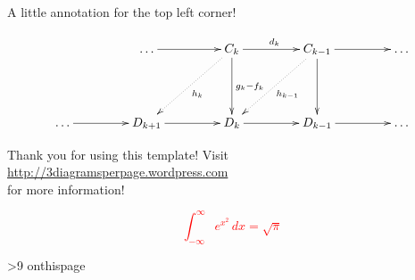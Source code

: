 \documentclass[a4paper]{article} %
\newcommand{\numberofpages}{9}
\newcommand{\multistamp}[1]{%
  \loop\unless\ifnum\value{page}>#1
    \dowhatsonthispage
  \repeat}
\newcommand{\dowhatsonthispage}{%
  \null\csname onthispage\thepage\endcsname\newpage}
\newcommand{\putonpage}[2]{%
  \expandafter\def\csname onthispage#1\endcsname{#2}}
\begin{document}
\pagestyle{empty} %
\thispagestyle{empty}


\putonpage{1}{%

\vspace{0cm} \hspace{0cm}
% 
\begin{boxedminipage}[t]{10cm} 
\scriptsize A little annotation for the top left corner! 
\end{boxedminipage}

\vspace{560pt} 
\hspace{100pt}
%
\begin{boxedminipage}[c]{400pt} 
\[
\xymatrix@+=1.55cm{ &\hdots \ar[r] & C_k \ar[r]^{d_k} \ar[d]^{g_k - f_k} \ar@{.>}[ld]^{h_k} & C_{k-1} \ar[r] \ar[d] \ar@{.>}[ld]^{h_{k-1}} & \hdots \\ \hdots \ar[r] & D_{k+1} \ar[r] & D_k \ar[r] & D_{k-1} \ar[r] & \hdots } 
\]
\end{boxedminipage}
}

	
\putonpage{2}{%

\vspace{15cm} \hspace{5cm}
%
\begin{boxedminipage}{10cm}
\begin{center}
Thank you for using this template! Visit \\
\href{http://3diagramsperpage.wordpress.com}{http://3diagramsperpage.wordpress.com} \\
for more information! 
\end{center}
\end{boxedminipage}
}

\putonpage{3}{
    \vspace{1cm}\hspace{3cm}
    \begin{boxedminipage}{5cm}
    \begin{center}
    \textcolor{red}{
    \[\int_{-\infty}^{\infty} e^{x^2}\, dx = \sqrt\pi\]
    }
    \end{center}
    \end{boxedminipage}
}

\multistamp{\numberofpages}
\end{document}

